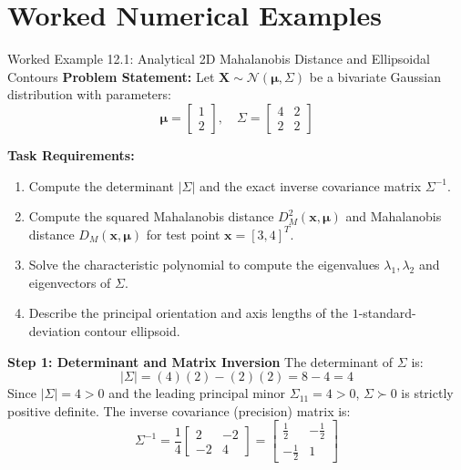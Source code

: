 \section{Worked Numerical Examples}

\begin{examplebox}[breakable]{Worked Example 12.1: Analytical 2D Mahalanobis Distance and Ellipsoidal Contours}
\textbf{Problem Statement:}
Let $\mathbf{X} \sim \mathcal{N}(\boldsymbol{\mu}, \Sigma)$ be a bivariate Gaussian distribution with parameters:
\begin{equation}
\boldsymbol{\mu} = \begin{bmatrix} 1 \\ 2 \end{bmatrix}, \quad \Sigma = \begin{bmatrix} 4 & 2 \\ 2 & 2 \end{bmatrix}
\end{equation}

\textbf{Task Requirements:}
\begin{enumerate}
    \item Compute the determinant $|\Sigma|$ and the exact inverse covariance matrix $\Sigma^{-1}$.
    \item Compute the squared Mahalanobis distance $D_M^2(\mathbf{x}, \boldsymbol{\mu})$ and Mahalanobis distance $D_M(\mathbf{x}, \boldsymbol{\mu})$ for test point $\mathbf{x} = [3, 4]^T$.
    \item Solve the characteristic polynomial to compute the eigenvalues $\lambda_1, \lambda_2$ and eigenvectors of $\Sigma$.
    \item Describe the principal orientation and axis lengths of the $1$-standard-deviation contour ellipsoid.
\end{enumerate}

\tcblower

\textbf{Step 1: Determinant and Matrix Inversion}
The determinant of $\Sigma$ is:
\begin{equation}
|\Sigma| = (4)(2) - (2)(2) = 8 - 4 = 4
\end{equation}
Since $|\Sigma| = 4 > 0$ and the leading principal minor $\Sigma_{11} = 4 > 0$, $\Sigma \succ 0$ is strictly positive definite.
The inverse covariance (precision) matrix is:
\begin{equation}
\Sigma^{-1} = \frac{1}{4} \begin{bmatrix} 2 & -2 \\ -2 & 4 \end{bmatrix} = \begin{bmatrix} \frac{1}{2} & -\frac{1}{2} \\ -\frac{1}{2} & 1 \end{bmatrix}
\end{equation}


\end{examplebox}

